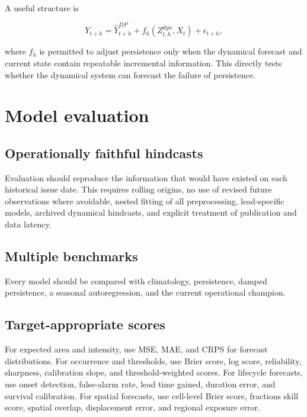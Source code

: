 \documentclass[11pt]{article}
\begin{document}
A useful structure is

\begin{equation}
Y_{t+h}
=
\hat Y^{DP}_{t+h}
+
f_h\!\left(Z^{dyn}_{t,h},X_t\right)
+
\epsilon_{t+h},
\end{equation}

where $f_h$ is permitted to adjust persistence only when the dynamical forecast and current state contain repeatable incremental information. This directly tests whether the dynamical system can forecast the failure of persistence.

\section{Model evaluation}

\subsection{Operationally faithful hindcasts}

Evaluation should reproduce the information that would have existed on each historical issue date. This requires rolling origins, no use of revised future observations where avoidable, nested fitting of all preprocessing, lead-specific models, archived dynamical hindcasts, and explicit treatment of publication and data latency.

\subsection{Multiple benchmarks}

Every model should be compared with climatology, persistence, damped persistence, a seasonal autoregression, and the current operational champion.

\subsection{Target-appropriate scores}

For expected area and intensity, use MSE, MAE, and CRPS for forecast distributions. For occurrence and thresholds, use Brier score, log score, reliability, sharpness, calibration slope, and threshold-weighted scores. For lifecycle forecasts, use onset detection, false-alarm rate, lead time gained, duration error, and survival calibration. For spatial forecasts, use cell-level Brier score, fractions skill score, spatial overlap, displacement error, and regional exposure error.
\end{document}
